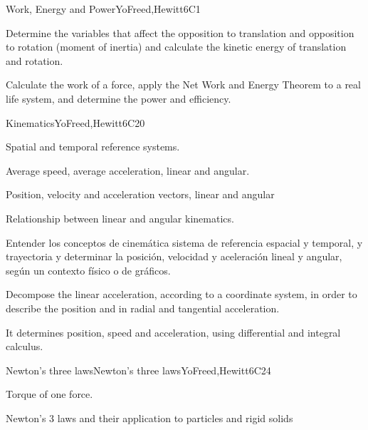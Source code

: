\begin{syllabus}
\begin{unit}{Work, Energy and Power}{}{YoFreed,Hewitt}{6}{C1}
      \begin{learningoutcomes}
         \item Determine the variables that affect the opposition to translation and opposition to rotation (moment of inertia) and calculate the kinetic energy of translation and rotation.
         \item Calculate the work of a force, apply the Net Work and Energy Theorem to a real life system, and determine the power and efficiency.
      \end{learningoutcomes}
   \end{unit}
   
   \begin{unit}{}{Kinematics}{YoFreed,Hewitt}{6}{C20}
   \begin{topics}
         \item Spatial and temporal reference systems.
         \item Average speed, average acceleration, linear and angular.
         \item Position, velocity and acceleration vectors, linear and angular
         \item Relationship between linear and angular kinematics.
       \end{topics}
      \begin{learningoutcomes}
         \item Entender los conceptos de cinemática sistema de referencia espacial y temporal, y trayectoria y determinar la posición, velocidad y aceleración lineal y angular, según un contexto físico o de gráficos.
         \item Decompose the linear acceleration, according to a coordinate system, in order to describe the position and in radial and tangential acceleration.
         \item It determines position, speed and acceleration, using differential and integral calculus. 
      \end{learningoutcomes}
   \end{unit}
   
   \begin{unit}{Newton's three laws}{Newton's three laws}{YoFreed,Hewitt}{6}{C24}
   \begin{topics}
         \item Torque of one force.
         \item Newton's 3 laws and their application to particles and rigid solids
      \end{topics}
   

\end{unit}
\end{syllabus}
